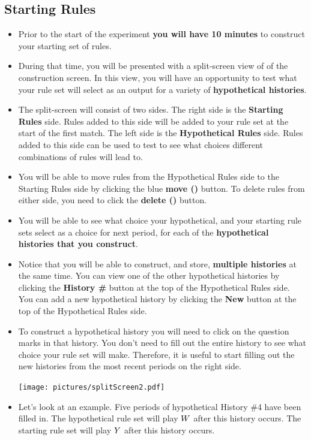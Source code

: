 \documentclass[11pt]{article}
\newcommand{\dblbkt}[1]{}
\begin{document}
\subsection*{\dblbkt{5}Starting Rules}
\begin{itemize} 
\item Prior to the start of the experiment {\bf you will have 10 minutes} to construct your starting set of rules.
\item During that time, you will be presented with a split-screen view of of the construction screen. In this view, you will have an opportunity to test what your rule set will select as an output for a variety of {\bf hypothetical histories}.
\item The split-screen will consist of two sides.  \dblbkt{1}The right side is the {\bf Starting Rules} side.  Rules added to this side will be added to your rule set at the start of the first match.   \dblbkt{1}The left side is the {\bf Hypothetical Rules} side.  Rules added to this side can be used to test to see what choices different combinations of rules will lead to.
\item  You will be able to move rules from the Hypothetical Rules side to the Starting Rules side \dblbkt{1}by clicking the blue {\bf move ()} button. To delete rules from either side, \dblbkt{1}you need to click the {\bf delete ()} button.
\item You will be able to see what choice \dblbkt{1}your hypothetical, and \dblbkt{1}your starting rule sets select as a choice for next period, for each of the {\bf hypothetical histories that you construct}.  
\item Notice that you will be able to construct, and store, {\bf multiple histories} \dblbkt{1}at the same time.  You can view one of the other hypothetical histories by clicking the \dblbkt{1}{\bf History \#} button at the top of the Hypothetical Rules side. You can add a new hypothetical history by clicking the \dblbkt{1}{\bf New} button at the top of the Hypothetical Rules side.  
\item  To construct  a hypothetical history you will need to click on the \dblbkt{1}question marks in that history.  You don't need to fill out the entire history to see what choice your rule set will make.  Therefore, it is useful to start filling out the new histories from the most recent periods on the right side. 

\texttt{[image: pictures/splitScreen2.pdf]} 

\item Let's look at an example. \dblbkt{1}Five periods of hypothetical History \#4 have been filled in.  \dblbkt{1}The hypothetical rule set will play $W$ after this history occurs.  \dblbkt{1}The starting rule set will play $Y$ after this history occurs. \dblbkt{slnc 5000}


\end{itemize}
\end{document}
